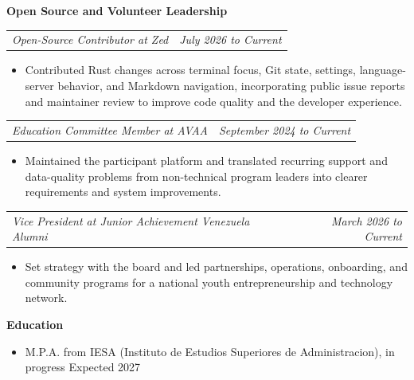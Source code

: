 \documentclass[10pt,letterpaper]{article}
\makeatletter
\newcommand{\bodyfont}{\fontsize{10.5}{15.75}\selectfont}
\newcommand{\sectiontitle}[1]{%
  \vspace{6pt}
  {\bodyfont\textbf{#1}}\par
  \nopagebreak[4]
  \vspace{4pt}
}
\newcommand{\roleline}[2]{%
  \begin{tabularx}{\textwidth}{@{}Xr@{}}
    \bodyfont\textit{#1} & \bodyfont\textit{#2}
  \end{tabularx}
  \nopagebreak[4]
  \vspace{1pt}
}
\makeatother
\begin{document}
\sectiontitle{Open Source and Volunteer Leadership}

\roleline{Open-Source Contributor at Zed}{July 2026 to Current}
\begin{itemize}
  \item Contributed Rust changes across terminal focus, Git state, settings, language-server behavior, and Markdown navigation, incorporating public issue reports and maintainer review to improve code quality and the developer experience.
\end{itemize}

\vspace{3pt}
\roleline{Education Committee Member at AVAA}{September 2024 to Current}
\begin{itemize}
  \item Maintained the participant platform and translated recurring support and data-quality problems from non-technical program leaders into clearer requirements and system improvements.
\end{itemize}

\vspace{3pt}
\roleline{Vice President at Junior Achievement Venezuela Alumni}{March 2026 to Current}
\begin{itemize}
  \item Set strategy with the board and led partnerships, operations, onboarding, and community programs for a national youth entrepreneurship and technology network.
\end{itemize}

\sectiontitle{Education}
\begin{itemize}
  \item M.P.A. from IESA (Instituto de Estudios Superiores de Administracion), in progress \hfill Expected 2027
\end{itemize}
\end{document}
